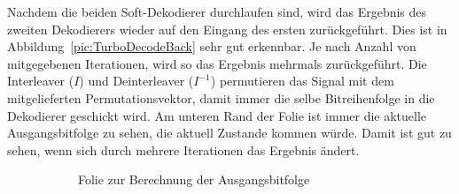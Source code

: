 Nachdem die beiden Soft-Dekodierer durchlaufen sind, wird das Ergebnis des zweiten Dekodierers wieder auf den Eingang des ersten zurückgeführt. Dies ist in Abbildung~\ref{pic:TurboDecodeBack} sehr gut erkennbar. Je nach Anzahl von mitgegebenen Iterationen, wird so das Ergebnis mehrmals zurückgeführt. Die Interleaver ($I$) und Deinterleaver ($I^{-1}$) permutieren das Signal mit dem mitgelieferten Permutationsvektor, damit immer die selbe Bitreihenfolge in die Dekodierer geschickt wird. Am unteren Rand der Folie ist immer die aktuelle Ausgangsbitfolge zu sehen, die aktuell Zustande kommen würde. Damit ist gut zu sehen, wenn sich durch mehrere Iterationen das Ergebnis ändert.

\begin{figure}[th]
\centering
	\begin{subfigure}{0.45\textwidth}
	\centering	
	\caption{Folie zur Berechnung der Ausgangsbitfolge}
	\label{pic:TurboDecodeResult}
	\end{subfigure}
	\qquad
	\begin{subfigure}{0.45\textwidth}
	\centering

\end{subfigure}
\end{figure}
